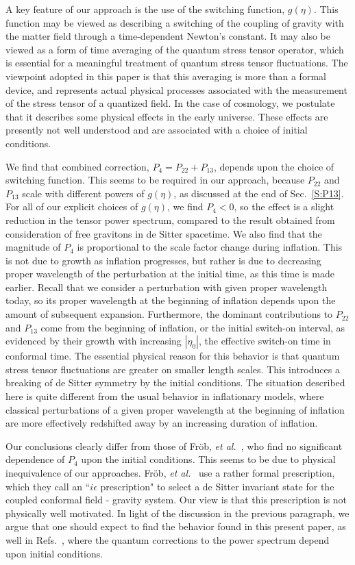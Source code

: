 \documentclass[preprint,prd,showpacs,superscriptaddress]{revtex4}
\begin{document}
A key feature of our approach is the use of the switching function, $g(\eta)$.  This function may be viewed as describing
a switching of the coupling of gravity with the matter field through a time-dependent Newton's constant. It may
also be viewed as a form of time averaging of the quantum stress tensor operator, which is essential for a
meaningful treatment of quantum stress tensor fluctuations. The viewpoint adopted in this paper is that this averaging
is more than a formal device, and represents actual physical processes associated with the measurement of the
stress tensor of a quantized field. In the case of cosmology, we postulate that it describes some physical effects in
the early universe. These effects are presently not well understood and are associated with a choice of initial conditions.

We find that combined correction, $P_4 = P_{22} + P_{13}$, depends upon the choice of switching function. This seems to
be required in our approach, because $P_{22}$ and $P_{13}$ scale with different powers of $g(\eta)$, as discussed 
at the end of Sec.~\ref{S:P13}.  For
all of our explicit choices of  $g(\eta)$, we find $P_4 < 0$, so the effect is a  slight reduction in the  tensor power spectrum,
compared to the result obtained from consideration of free gravitons in de Sitter spacetime. We also find that the
magnitude of $P_4$ is proportional to the scale factor change during inflation. This is not due to growth as inflation
progresses, but rather is due to decreasing proper wavelength of the perturbation at the initial time, as this time is made 
earlier. Recall that we consider a perturbation with given proper wavelength today, so its  proper wavelength at the beginning
of inflation depends upon the amount of subsequent expansion. Furthermore, the dominant contributions to $P_{22}$ and 
$P_{13}$ come from the beginning of inflation, or the initial switch-on interval, as evidenced by their growth with
increasing $|\eta_0|$, the effective switch-on time in conformal time. The essential physical reason for this behavior is
that quantum stress tensor fluctuations are greater on smaller length scales. This introduces a breaking of de Sitter symmetry
by the initial conditions. The situation described here is quite different from the usual behavior in inflationary models, where
classical perturbations of a given proper wavelength at the beginning of inflation are more effectively redshifted away by
an increasing duration of inflation.

Our conclusions clearly differ from those of  Fr{\"o}b, {\it et al.}~\cite{FRV12}, who find no significant dependence of  $P_4$
upon the initial conditions. This seems to be due to physical inequivalence of our approaches. Fr{\"o}b, {\it et al.}~\cite{FRV12}
use a rather formal prescription, which they call an ``$i \epsilon$ prescription"  to select a de Sitter invariant state for the
coupled conformal field - gravity system. Our view is that this prescription is not physically well motivated. In light of the
discussion in the previous paragraph, we argue that one should expect to find the behavior found in this present paper, as well 
in Refs.~\cite{WKF07,FMNWW10,WHFN11}, where the quantum corrections to the power spectrum depend upon initial
conditions.
\end{document}

